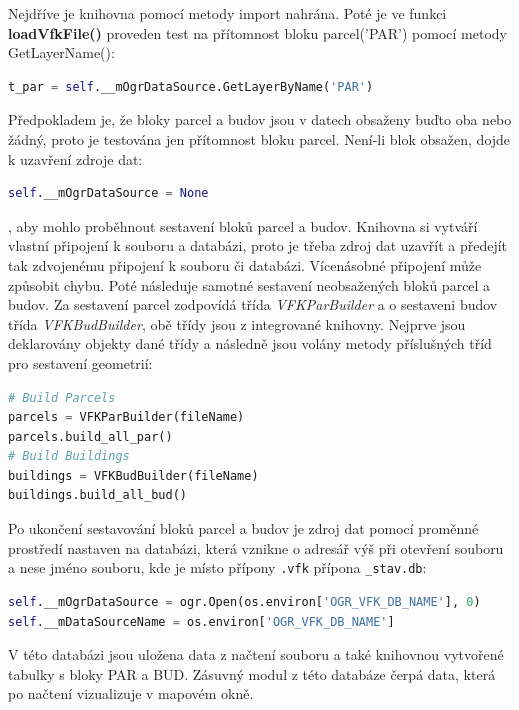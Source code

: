 Nejdříve je knihovna pomocí metody import nahrána. Poté je ve funkci
\textbf{loadVfkFile()} proveden test na přítomnost bloku parcel('PAR')
pomocí metody GetLayerName():
\begin{lstlisting}[language=Python, numbers=none]
t_par = self.__mOgrDataSource.GetLayerByName('PAR')
\end{lstlisting}
Předpokladem je, že bloky parcel a budov jsou v datech obsaženy buďto oba nebo žádný, proto je testována jen přítomnost bloku parcel. Není-li blok obsažen, dojde k uzavření zdroje dat:
\begin{lstlisting}[language=Python, numbers=none]
self.__mOgrDataSource = None
\end{lstlisting}
, aby mohlo proběhnout sestavení bloků parcel a budov. Knihovna si
vytváří vlastní připojení k  souboru a databázi, proto je
třeba zdroj dat uzavřít a předejít tak zdvojenému připojení k 
souboru či databázi. Vícenásobné připojení může způsobit chybu. Poté
následuje samotné sestavení neobsažených bloků parcel a budov. Za
sestavení parcel zodpovídá třída \textit{VFKParBuilder} a o sestaveni
budov třída \textit{VFKBudBuilder}, obě třídy jsou z integrované
knihovny. Nejprve jsou deklarovány objekty dané třídy a následně jsou
volány metody příslušných tříd pro sestavení geometrií:

\begin{lstlisting}[language=Python, numbers=none]
# Build Parcels
parcels = VFKParBuilder(fileName)
parcels.build_all_par()
# Build Buildings
buildings = VFKBudBuilder(fileName)
buildings.build_all_bud()
\end{lstlisting}

Po ukončení sestavování bloků parcel a budov je zdroj dat pomocí
proměnné prostředí nastaven na databázi, která vznikne o adresář výš
při otevření  souboru a nese jméno  souboru, kde je
místo přípony \verb|.vfk| přípona \verb|_stav.db|: {\small
\begin{lstlisting}[language=Python, numbers=none]
self.__mOgrDataSource = ogr.Open(os.environ['OGR_VFK_DB_NAME'], 0)
self.__mDataSourceName = os.environ['OGR_VFK_DB_NAME']
\end{lstlisting}}

V této databázi jsou uložena data z načtení  souboru a také
knihovnou vytvořené tabulky s bloky PAR a BUD. Zásuvný modul z této
databáze čerpá data, která po načtení vizualizuje v mapovém okně.

